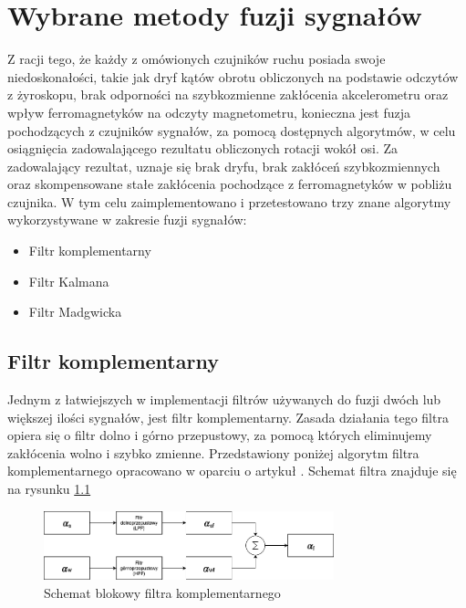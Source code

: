 \chapter{Wybrane metody fuzji sygnałów}
\label{chap:wybrane}

Z racji tego, że każdy z omówionych czujników ruchu posiada swoje niedoskonałości, takie jak dryf kątów obrotu obliczonych na podstawie odczytów z żyroskopu, brak odporności na szybkozmienne zakłócenia akcelerometru oraz wpływ ferromagnetyków na odczyty magnetometru, konieczna jest fuzja pochodzących z czujników sygnałów, za pomocą dostępnych algorytmów, w celu osiągnięcia zadowalającego rezultatu obliczonych rotacji wokół osi. Za zadowalający rezultat, uznaje się brak dryfu, brak zakłóceń szybkozmiennych oraz skompensowane stałe zakłócenia pochodzące z ferromagnetyków w pobliżu czujnika. W tym celu zaimplementowano i przetestowano trzy znane algorytmy wykorzystywane w zakresie fuzji sygnałów:
\begin{itemize}
    \item Filtr komplementarny
    \item Filtr Kalmana
    \item Filtr Madgwicka
\end{itemize}

\section{Filtr komplementarny}

Jednym z łatwiejszych w implementacji filtrów używanych do fuzji dwóch lub większej ilości sygnałów, jest filtr komplementarny. Zasada działania tego filtra opiera się o filtr dolno i górno przepustowy, za pomocą których eliminujemy zakłócenia wolno i szybko zmienne. Przedstawiony poniżej algorytm filtra komplementarnego opracowano w oparciu o artykuł \cite{Komplementarny2}. Schemat filtra znajduje się na rysunku \ref{filtr komplementarny}

\begin{figure}[h!]
    \centering
    \includegraphics[width=0.75\textwidth]{Rysunki/Rozdzial04/Filtr_komplementarny.png}
    \caption{Schemat blokowy filtra komplementarnego}
    \label{filtr komplementarny}
\end{figure}

